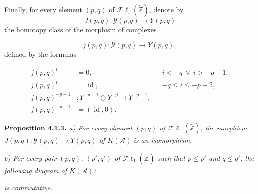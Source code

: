 \clearpage
{}%
\begingroup\small\setlength{\parskip}{0pt}\setlength{\emergencystretch}{1.5em}
\setlength{\abovedisplayskip}{4pt plus 2pt minus 2pt}%
\setlength{\belowdisplayskip}{4pt plus 2pt minus 2pt}%

Finally, for every element $(p,q)$ of
$\mathcal{F}\ell_1(\widetilde{\mathbb Z})$, denote by
\begin{equation}
J(p,q)\colon\mathcal Y(p,q)\longrightarrow Y(p,q)
\tag{4.1.2.9}
\end{equation}
the homotopy class of the morphism of complexes

\begin{equation}
j(p,q)\colon\mathcal Y(p,q)\longrightarrow Y(p,q),
\tag{4.1.2.10}
\end{equation}
defined by the formulas

\begin{equation}
\begin{aligned}
j(p,q)^i&=0,
  &&i<-q\ \lor\ i>-p-1,\\
j(p,q)^i&=\operatorname{id},
  &&-q\leq i\leq-p-2,\\
j(p,q)^{-p-1}&\colon
  Y^{-p-1}\oplus Y^{-p}\longrightarrow Y^{-p-1},\\
j(p,q)^{-p-1}&=(\operatorname{id},0).
\end{aligned}
\tag{4.1.2.11}
\end{equation}

\medskip\noindent\textbf{Proposition 4.1.3.}\quad
\textit{a) For every element $(p,q)$ of
$\mathcal{F}\ell_1(\widetilde{\mathbb Z})$, the morphism
$J(p,q)\colon\mathcal Y(p,q)\longrightarrow Y(p,q)$ of $K(\mathcal A)$ is
an isomorphism.}

\noindent\textit{b) For every pair $(p,q)$, $(p',q')$ of
$\mathcal{F}\ell_1(\widetilde{\mathbb Z})$ such that $p\leq p'$ and
$q\leq q'$, the following diagram of $K(\mathcal A)$:}

\begin{center}
\end{center}
\noindent\textit{is commutative.}

